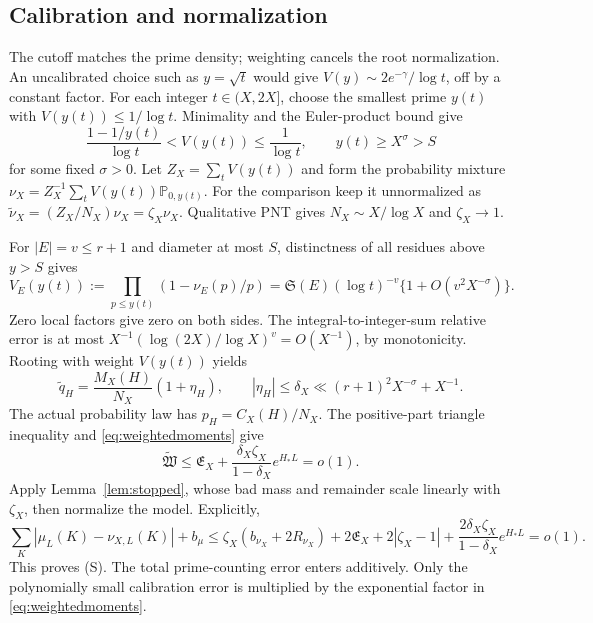 \documentclass[11pt,a4paper]{article}
\newcommand{\Prob}{\mathbb P}
\begin{document}
\subsection{Calibration and normalization}

The cutoff matches the prime density; weighting cancels the root normalization.
An uncalibrated choice such as $y=\sqrt t$ would give
$V(y)\sim2e^{-\gamma}/\log t$, off by a constant factor.
For each integer $t\in(X,2X]$, choose the smallest prime $y(t)$
with $V(y(t))\le1/\log t$. Minimality and the Euler-product bound give
\[
 \frac{1-1/y(t)}{\log t}<V(y(t))\le\frac1{\log t},\qquad
                         y(t)\ge X^\sigma>S
\]
for some fixed $\sigma>0$. Let $Z_X=\sum_tV(y(t))$ and form the
probability mixture $\nu_X=Z_X^{-1}\sum_tV(y(t))\Prob_{0,y(t)}$.
For the comparison keep it unnormalized as
$\widetilde\nu_X=(Z_X/N_X)\nu_X=\zeta_X\nu_X$.
Qualitative PNT gives $N_X\sim X/\log X$ and $\zeta_X\to1$.

For $|E|=v\le r+1$ and diameter at most $S$, distinctness of all
residues above $y>S$ gives
\[
 V_E(y(t)):=\prod_{p\le y(t)}(1-\nu_E(p)/p)
     =\mathfrak S(E)(\log t)^{-v}\{1+O(v^2X^{-\sigma})\}.
\]
Zero local factors give zero on both sides. The integral-to-integer-sum
relative error is at most
$X^{-1}(\log(2X)/\log X)^v=O(X^{-1})$, by monotonicity.
Rooting with weight $V(y(t))$ yields
\begin{equation}\label{eq:calibrated}
 \widetilde q_H=\frac{M_X(H)}{N_X}(1+\eta_H),\qquad
 |\eta_H|\le\delta_X\ll(r+1)^2X^{-\sigma}+X^{-1}.
\end{equation}
The actual probability law has $p_H=C_X(H)/N_X$.
The positive-part triangle inequality and \eqref{eq:weightedmoments} give
\[
 \widetilde{\mathfrak W}\le\mathfrak E_X+
    \frac{\delta_X\zeta_X}{1-\delta_X}e^{H_*L}=o(1).
\]
Apply Lemma~\ref{lem:stopped}, whose bad mass and remainder scale
linearly with $\zeta_X$, then normalize the model. Explicitly,
\begin{equation}\label{eq:massadapter}
 \sum_K|\mu_L(K)-\nu_{X,L}(K)|+b_\mu
 \le\zeta_X(b_{\nu_X}+2R_{\nu_X})+2\mathfrak E_X
      +2|\zeta_X-1|+
        \frac{2\delta_X\zeta_X}{1-\delta_X}e^{H_*L}=o(1).
\end{equation}
This proves (S). The total prime-counting error enters additively.
Only the polynomially small calibration error is multiplied by the
exponential factor in \eqref{eq:weightedmoments}.
\end{document}
